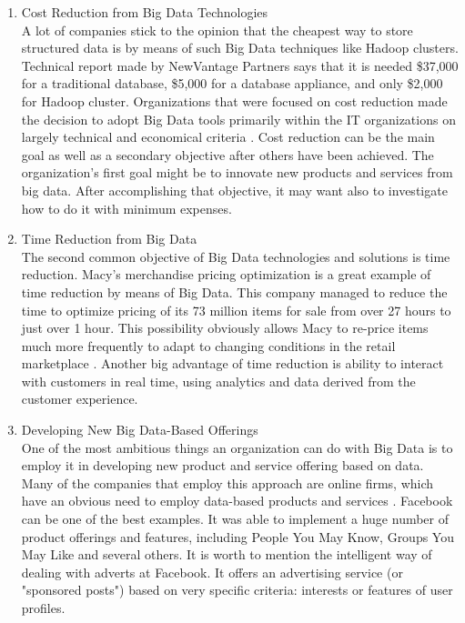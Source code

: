 \documentclass[runningheads]{llncs}
\begin{document}
\begin{enumerate}
\item Cost Reduction from Big Data Technologies\\

A lot of companies stick to the opinion that the cheapest way to store structured data is by means of such Big Data techniques like Hadoop clusters. Technical report \cite{NEWVANTAGE} made by NewVantage Partners says that it is needed \$37,000 for a traditional database, \$5,000 for a database appliance, and only \$2,000 for Hadoop cluster. Organizations that were focused on cost reduction made the decision to adopt Big Data tools primarily within the IT organizations on largely technical and economical criteria \cite{DAVENPORT}. Cost reduction can be the main goal as well as a secondary objective after others have been achieved. The organization's first goal might be to innovate new products and services from big data. After accomplishing that objective, it may want also to investigate how to do it with minimum expenses.\\

\item Time Reduction from Big Data\\

The second common objective of Big Data technologies and solutions is time reduction. Macy's merchandise pricing optimization is a great example of time reduction by means of Big Data. This company managed to reduce the time to optimize pricing of its 73 million items for sale from over 27 hours to just over 1 hour. This possibility obviously allows Macy to re-price items much more frequently to adapt to changing conditions in the retail marketplace \cite{DAVENPORT}. Another big advantage of time reduction is ability to interact with customers in real time, using analytics and data derived from the customer experience.\\

\item Developing New Big Data-Based Offerings\\

One of the most ambitious things an organization can do with Big Data is to employ it in developing new product and service offering based on data. Many of the companies that employ this approach are online firms, which have an obvious need to employ data-based products and services \cite{DAVENPORT}. Facebook can be one of the best examples. It was able to implement a huge number of product offerings and features, including People You May Know, Groups You May Like and several others. It is worth to mention the intelligent way of dealing with adverts at Facebook. It offers an advertising service (or "sponsored posts") based on very specific criteria: interests or features of user profiles. 


\end{enumerate}
\end{document}
